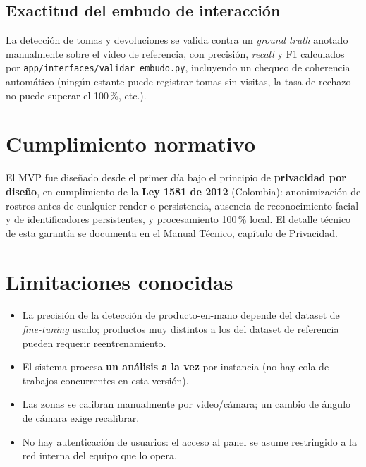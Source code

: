 \documentclass[11pt,a4paper]{report}
\begin{document}
\section{Exactitud del embudo de interacción}

La detección de tomas y devoluciones se valida contra un \textit{ground truth} anotado
manualmente sobre el video de referencia, con precisión, \textit{recall} y F1 calculados por
\texttt{app/interfaces/validar\_embudo.py}, incluyendo un chequeo de coherencia automático
(ningún estante puede registrar tomas sin visitas, la tasa de rechazo no puede superar el
100\,\%, etc.).

\chapter{Cumplimiento normativo}

El MVP fue diseñado desde el primer día bajo el principio de \textbf{privacidad por diseño}, en
cumplimiento de la \textbf{Ley 1581 de 2012} (Colombia): anonimización de rostros antes de
cualquier render o persistencia, ausencia de reconocimiento facial y de identificadores
persistentes, y procesamiento 100\,\% local. El detalle técnico de esta garantía se documenta en
el Manual Técnico, capítulo de Privacidad.

\chapter{Limitaciones conocidas}

\begin{itemize}
  \item La precisión de la detección de producto-en-mano depende del dataset de
    \textit{fine-tuning} usado; productos muy distintos a los del dataset de referencia pueden
    requerir reentrenamiento.
  \item El sistema procesa \textbf{un análisis a la vez} por instancia (no hay cola de trabajos
    concurrentes en esta versión).
  \item Las zonas se calibran manualmente por video/cámara; un cambio de ángulo de cámara exige
    recalibrar.
  \item No hay autenticación de usuarios: el acceso al panel se asume restringido a la red
    interna del equipo que lo opera.
\end{itemize}
\end{document}
